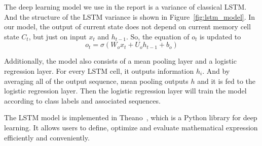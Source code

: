 The deep learning model we use in the report is a variance of classical LSTM. And the structure of the LSTM variance is shown in Figure~\ref{fig:lstm_model}. In our model, the output of current state does not depend on current memory cell state $C_t$, but just on input $x_t$ and $h_{t-1}$. So, the equation of $o_t$ is updated to
$$
o_t = \sigma (W_o x_t + U_o h_{t-1} + b_o)
$$

Additionally, the model also consists of a mean pooling layer and a logistic regression layer. For every LSTM cell, it outputs information $h_i$. And by averaging all of the output sequence, mean pooling outputs $h$ and it is fed to the logistic regression layer. Then the logistic regression layer will train the model according to class labels and associated sequences.

The LSTM model is implemented in Theano~\cite{bastien2012, bergstra2010}, which is a Python library for deep learning. It allows users to define, optimize and evaluate mathematical expression efficiently and conveniently. 
